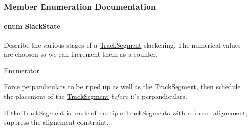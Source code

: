 \subsubsection{Member Enumeration Documentation}
\hypertarget{classKite_1_1DataNegociate_ab7ccb6fc1f298728995250a3bbcf18c7}{
\paragraph[{Slack\-State}]{\setlength{\rightskip}{0pt plus 5cm}enum {\bf Slack\-State}}}\label{classKite_1_1DataNegociate_ab7ccb6fc1f298728995250a3bbcf18c7}
Describe the various stages of a \hyperlink{classKite_1_1TrackSegment}{Track\-Segment} slackening. The numerical values are choosen so we can increment them as a counter. \begin{Desc}
\item[Enumerator]\par
\begin{description}
\item[{\em 
\hypertarget{classKite_1_1DataNegociate_ab7ccb6fc1f298728995250a3bbcf18c7a19d8d157762b2b73c5274e4865523d29}{Ripup\-Perpandiculars}\label{classKite_1_1DataNegociate_ab7ccb6fc1f298728995250a3bbcf18c7a19d8d157762b2b73c5274e4865523d29}
}]Force perpandiculars to be riped up as well as the \hyperlink{classKite_1_1TrackSegment}{Track\-Segment}, then schedule the placement of the \hyperlink{classKite_1_1TrackSegment}{Track\-Segment} {\itshape before} it's perpandiculars. \item[{\em 
\hypertarget{classKite_1_1DataNegociate_ab7ccb6fc1f298728995250a3bbcf18c7a548e204a4e2ffae50774910737f11380}{Minimize}\label{classKite_1_1DataNegociate_ab7ccb6fc1f298728995250a3bbcf18c7a548e204a4e2ffae50774910737f11380}
}]If the \hyperlink{classKite_1_1TrackSegment}{Track\-Segment} is made of multiple Track\-Segments with a forced alignement, suppress the alignement constraint.


\end{description}
\end{Desc}
